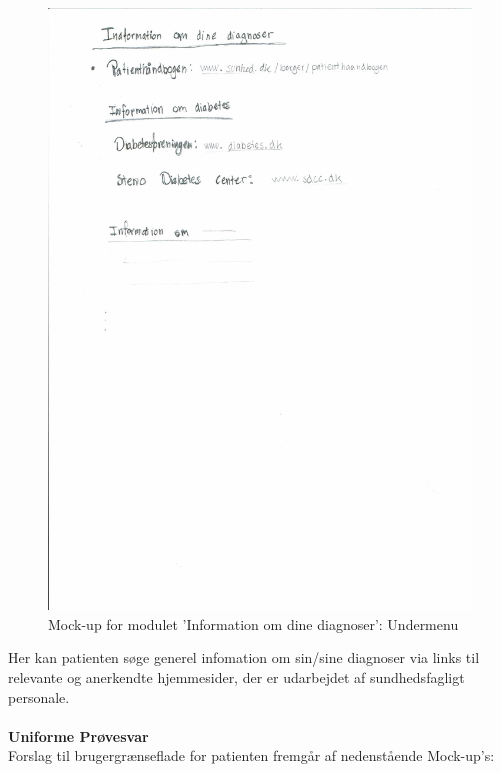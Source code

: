 \begin{figure}[H]
	\centering
	\includegraphics[angle=0, width=140mm]{Materials/Info2.pdf}
	\caption{Mock-up for modulet 'Information om dine diagnoser': Undermenu}
	\label{fig:Mock-Up6}
\end{figure}
Her kan patienten søge generel infomation om sin/sine diagnoser via links til relevante og anerkendte hjemmesider, der er udarbejdet af sundhedsfagligt personale.\\\\
\textbf{Uniforme Prøvesvar} \\
Forslag til brugergrænseflade for patienten fremgår af nedenstående Mock-up's:\\
